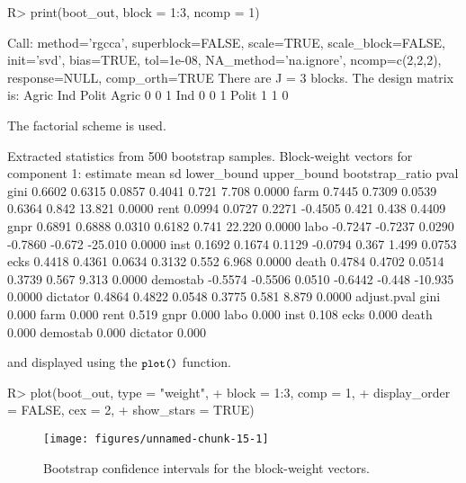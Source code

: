 \documentclass[
]{jss}
\begin{document}
\begin{CodeChunk}
\begin{CodeInput}
R> print(boot_out, block = 1:3, ncomp = 1)
\end{CodeInput}
\begin{CodeOutput}
Call: method='rgcca', superblock=FALSE, scale=TRUE, scale_block=FALSE, init='svd',
bias=TRUE, tol=1e-08, NA_method='na.ignore', ncomp=c(2,2,2), response=NULL,
comp_orth=TRUE 
There are J = 3 blocks.
The design matrix is:
      Agric Ind Polit
Agric     0   0     1
Ind       0   0     1
Polit     1   1     0

The factorial scheme is used.

Extracted statistics from 500 bootstrap samples.
Block-weight vectors for component 1: 
         estimate    mean     sd lower_bound upper_bound bootstrap_ratio   pval
gini       0.6602  0.6315 0.0857      0.4041       0.721           7.708 0.0000
farm       0.7445  0.7309 0.0539      0.6364       0.842          13.821 0.0000
rent       0.0994  0.0727 0.2271     -0.4505       0.421           0.438 0.4409
gnpr       0.6891  0.6888 0.0310      0.6182       0.741          22.220 0.0000
labo      -0.7247 -0.7237 0.0290     -0.7860      -0.672         -25.010 0.0000
inst       0.1692  0.1674 0.1129     -0.0794       0.367           1.499 0.0753
ecks       0.4418  0.4361 0.0634      0.3132       0.552           6.968 0.0000
death      0.4784  0.4702 0.0514      0.3739       0.567           9.313 0.0000
demostab  -0.5574 -0.5506 0.0510     -0.6442      -0.448         -10.935 0.0000
dictator   0.4864  0.4822 0.0548      0.3775       0.581           8.879 0.0000
         adjust.pval
gini           0.000
farm           0.000
rent           0.519
gnpr           0.000
labo           0.000
inst           0.108
ecks           0.000
death          0.000
demostab       0.000
dictator       0.000
\end{CodeOutput}
\end{CodeChunk}

\normalsize

and displayed using the \(\small{\texttt{plot()}}\) function.

\footnotesize

\begin{CodeChunk}
\begin{CodeInput}
R> plot(boot_out, type = "weight", 
+      block = 1:3, comp = 1, 
+      display_order = FALSE, cex = 2,
+      show_stars = TRUE)
\end{CodeInput}
\begin{figure}[H]

{\centering \texttt{[image: figures/unnamed-chunk-15-1]} 

}

\caption[Bootstrap confidence intervals for the block-weight vectors]{Bootstrap confidence intervals for the block-weight vectors.}\label{fig:unnamed-chunk-15}
\end{figure}
\end{CodeChunk}
\end{document}
